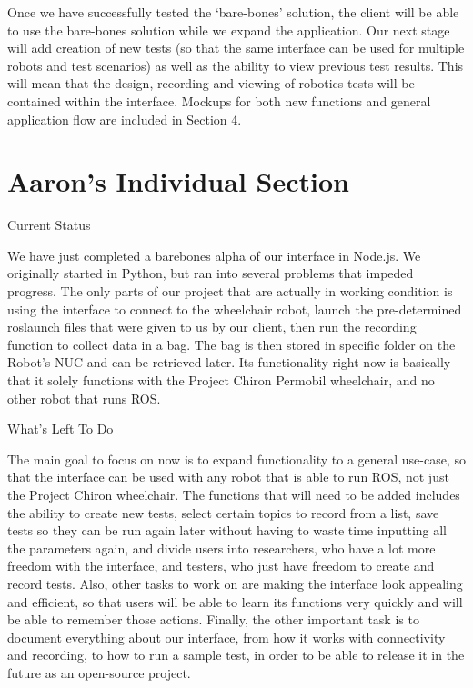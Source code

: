 \documentclass[onecolumn, draftclsnofoot,10pt, compsoc]{IEEEtran}
\begin{document}
Once we have successfully tested the ‘bare-bones’ solution, the client will be able to use the bare-bones solution while we expand the application. Our next stage will add creation of new tests (so that the same interface can be used for multiple robots and test scenarios) as well as the ability to view previous test results. This will mean that the design, recording and viewing of robotics tests will be contained within the interface. Mockups for both new functions and general application flow are included in Section 4. 


\section{Aaron's Individual Section}

Current Status

We have just completed a barebones alpha of our interface in Node.js. We originally started in Python, but ran into several problems that impeded progress. The only parts of our project that are actually in working condition is using the interface to connect to the wheelchair robot, launch the pre-determined roslaunch files that were given to us by our client, then run the recording function to collect data in a bag. The bag is then stored in specific folder on the Robot's NUC and can be retrieved later. Its functionality right now is basically that it solely functions with the Project Chiron Permobil wheelchair, and no other robot that runs ROS.

What's Left To Do

The main goal to focus on now is to expand functionality to a general use-case, so that the interface can be used with any robot that is able to run ROS, not just the Project Chiron wheelchair. The functions that will need to be added includes the ability to create new tests, select certain topics to record from a list, save tests so they can be run again later without having to waste time inputting all the parameters again, and divide users into researchers, who have a lot more freedom with the interface, and testers, who just have freedom to create and record tests. Also, other tasks to work on are making the interface look appealing and efficient, so that users will be able to learn its functions very quickly and will be able to remember those actions. Finally, the other important task is to document everything about our interface, from how it works with connectivity and recording, to how to run a sample test, in order to be able to release it in the future as an open-source project.
\end{document}

